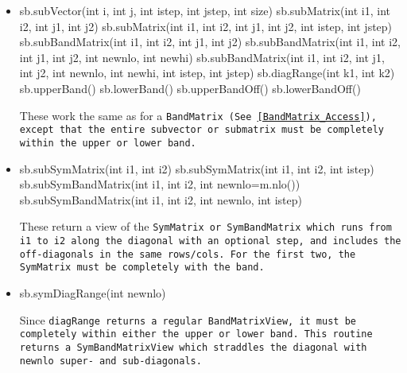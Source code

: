 \begin{itemize}
\item
\begin{tmvcode}
sb.subVector(int i, int j, int istep, int jstep, int size)
sb.subMatrix(int i1, int i2, int j1, int j2)
sb.subMatrix(int i1, int i2, int j1, int j2, int istep, int jstep)
sb.subBandMatrix(int i1, int i2, int j1, int j2)
sb.subBandMatrix(int i1, int i2, int j1, int j2, int newnlo, int newhi)
sb.subBandMatrix(int i1, int i2, int j1, int j2, int newnlo, int newhi, 
      int istep, int jstep)
sb.diagRange(int k1, int k2)
sb.upperBand()
sb.lowerBand()
sb.upperBandOff()
sb.lowerBandOff()
\end{tmvcode}
These work the same as for a \tt{BandMatrix}
(See \ref{BandMatrix_Access}),
except that the entire
subvector or submatrix must be completely within the upper or lower band.

\item
\begin{tmvcode}
sb.subSymMatrix(int i1, int i2)
sb.subSymMatrix(int i1, int i2, int istep)
sb.subSymBandMatrix(int i1, int i2, int newnlo=m.nlo())
sb.subSymBandMatrix(int i1, int i2, int newnlo, int istep)
\end{tmvcode}
These return a view of the \tt{SymMatrix} or \tt{SymBandMatrix} which runs
from \tt{i1} to \tt{i2} along the diagonal with an optional step,
and includes the off-diagonals in the same rows/cols.  For the first two,
the \tt{SymMatrix} must be completely with the band.

\item
\begin{tmvcode}
sb.symDiagRange(int newnlo)
\end{tmvcode}
Since \tt{diagRange} returns a regular \tt{BandMatrixView}, it must be completely
within either the upper or lower band.  This routine returns a \tt{SymBandMatrixView}
which straddles the diagonal with \tt{newnlo} super- and sub-diagonals.


\end{itemize}
